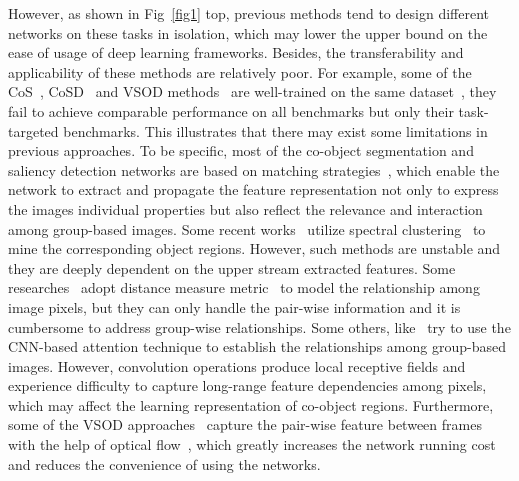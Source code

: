 \documentclass[journal]{IEEEtran}
\begin{document}
However, as shown in Fig~\ref{fig1} top, previous methods tend to design different networks on these tasks in isolation, which may lower the upper bound on the ease of usage of deep learning frameworks. 
Besides, the transferability and applicability of these methods are relatively poor.
For example, some of the CoS~\cite{zhang2020deep,li2019group}, CoSD~\cite{zhang2021summarize,zhang2021deepacg} and VSOD methods~\cite{gu2020pyramid,ji2021full} are well-trained on the same dataset~\cite{lin2014microsoft,wang2017learning}, they fail to achieve comparable performance on all benchmarks but only their task-targeted benchmarks. 
This illustrates that there may exist some limitations in previous approaches. 
To be specific, most of the co-object segmentation and saliency detection networks are based on matching strategies~\cite{ma2021image,liu2020semantic}, which enable the network to extract and propagate the feature representation not only to express the images individual properties but also reflect the relevance and interaction among group-based images. Some recent works~\cite{zhang2020adaptive,zhang2020deep} utilize spectral clustering~\cite{von2007tutorial} to mine the corresponding object regions. However, such methods are unstable and they are deeply dependent on the upper stream extracted features. Some  researches~\cite{zhang2021deepacg,zhang2020deepemd} adopt distance measure metric~\cite{solomon2016entropic,rubner2000earth} to model the relationship among image pixels, but they can only handle the pair-wise information and it is cumbersome to address group-wise relationships. Some others, like~\cite{fan2021group,zhang2021summarize} try to use the CNN-based attention technique to establish the relationships among group-based images. However, convolution operations produce local receptive fields and experience difficulty to capture long-range feature dependencies among pixels, which may affect the learning representation of co-object regions.
Furthermore, some of the VSOD approaches~\cite{ji2021full,xu2019video} capture the pair-wise feature between frames with the help of optical flow~\cite{ilg2017flownet}, which greatly increases the network running cost and reduces the convenience of using the networks. 
\end{document}
